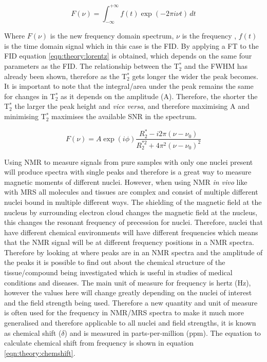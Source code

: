 \documentclass[class=article, crop=false]{standalone}
\begin{document}
\begin{equation}
    F(\nu) = \int_{-\infty}^{+\infty} f(t)\exp(-2\pi i \nu t) \, dt
    \label{eqn:theory:fourier}
\end{equation}

Where $F(\nu)$ is the new frequency domain spectrum, $\nu$ is the frequency , $f(t)$ is the time domain signal which in this case is the FID. By applying a FT to the FID equation \ref{eqn:theory:lorentz} is obtained, which depends on the same four parameters as the FID. The relationship between the T$_2^*$ and the FWHM has already been shown, therefore as the T$_2^*$ gets longer the wider the peak becomes. It is important to note that the integral/area under the peak remains the same for changes in T$_2^*$ as it depends on the amplitude (A). Therefore, the shorter the T$_2^*$ the larger the peak height and \textit{vice versa}, and therefore maximising A and minimising T$_2^*$ maximises the available SNR in the spectrum.

\begin{equation}
    F(\nu) = A\exp(i\phi)\frac{R_2^*-i2\pi(\nu-\nu_0)}{R_2^{*2}+4\pi^2(\nu-\nu_0)^2}
    \label{eqn:theory:lorentz}
\end{equation}

Using NMR to measure signals from pure samples with only one nuclei present will produce spectra with single peaks and therefore is a great way to measure magnetic moments of different nuclei. However, when using NMR \textit{in vivo} like with MRS all molecules and tissues are complex and consist of multiple different nuclei bound in multiple different ways. The shielding of the magnetic field at the nucleus by surrounding electron cloud changes the magnetic field at the nucleus, this changes the resonant frequency of precession for nuclei. Therefore, nuclei that have different chemical environments will have different frequencies which means that the NMR signal will be at different frequency positions in a NMR spectra. Therefore by looking at where peaks are in an NMR spectra and the amplitude of the peaks it is possible to find out about the chemical structure of the tissue/compound being investigated which is useful in studies of medical conditions and diseases. The main unit of measure for frequency is hertz (Hz), however the values here will change greatly depending on the nuclei of interest and the field strength being used. Therefore a new quantity and unit of measure is often used for the frequency in NMR/MRS spectra to make it much more generalised and therefore applicable to all nuclei and field strengths, it is known as chemical shift ($\delta$) and is measured in parts-per-million (ppm). The equation to calculate chemical shift from frequency is shown in equation \ref{eqn:theory:chemshift}.
\end{document}
